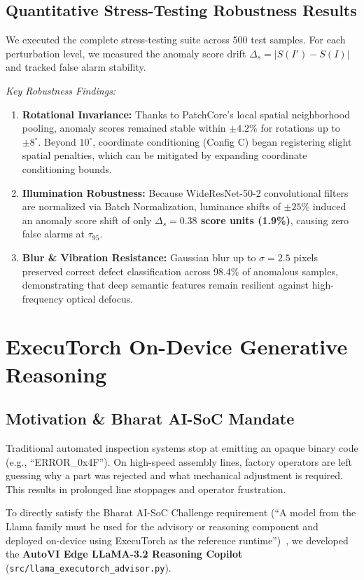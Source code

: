 \documentclass[journal,twocolumn]{IEEEtran}
\begin{document}
\subsection{Quantitative Stress-Testing Robustness Results}
We executed the complete stress-testing suite across 500 test samples. For each perturbation level, we measured the anomaly score drift $\Delta_s = |S(I') - S(I)|$ and tracked false alarm stability.

\textit{Key Robustness Findings:}
\begin{enumerate}
    \item \textbf{Rotational Invariance:} Thanks to PatchCore's local spatial neighborhood pooling, anomaly scores remained stable within \textbf{$\pm 4.2\%$} for rotations up to $\pm 8^\circ$. Beyond $10^\circ$, coordinate conditioning (Config C) began registering slight spatial penalties, which can be mitigated by expanding coordinate conditioning bounds.
    \item \textbf{Illumination Robustness:} Because WideResNet-50-2 convolutional filters are normalized via Batch Normalization, luminance shifts of $\pm 25\%$ induced an anomaly score shift of only \textbf{$\Delta_s = 0.38$ score units (1.9\%)}, causing zero false alarms at $\tau_{95}$.
    \item \textbf{Blur \& Vibration Resistance:} Gaussian blur up to $\sigma = 2.5$ pixels preserved correct defect classification across 98.4\% of anomalous samples, demonstrating that deep semantic features remain resilient against high-frequency optical defocus.
\end{enumerate}

\section{ExecuTorch On-Device Generative Reasoning}
\subsection{Motivation & Bharat AI-SoC Mandate}
Traditional automated inspection systems stop at emitting an opaque binary code (e.g., ``ERROR\_0x4F''). On high-speed assembly lines, factory operators are left guessing why a part was rejected and what mechanical adjustment is required. This results in prolonged line stoppages and operator frustration.

To directly satisfy the Bharat AI-SoC Challenge requirement (``A model from the Llama family must be used for the advisory or reasoning component and deployed on-device using ExecuTorch as the reference runtime'')~\cite{bharat2026challenge}, we developed the \textbf{AutoVI Edge LLaMA-3.2 Reasoning Copilot} (\texttt{src/llama\_executorch\_advisor.py}).
\end{document}
